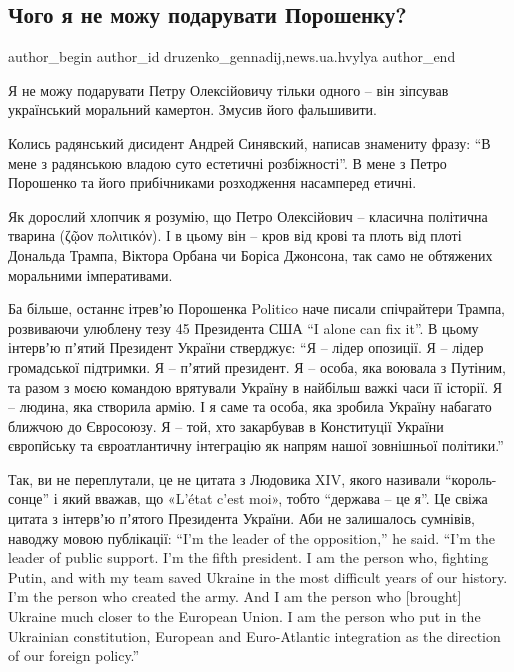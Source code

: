  
 
 
 
 
\subsection{Чого я не можу подарувати Порошенку?}
\label{sec:16_01_2022.stz.news.ua.hvylya.2.poroshenko_kamerton}

\ifcmt
 author_begin
   author_id druzenko_gennadij,news.ua.hvylya
 author_end
\fi

\begin{zznagolos}
Я не можу подарувати Петру Олексійовичу тільки одного – він зіпсував
український моральний камертон. Змусив його фальшивити.
\end{zznagolos}


Колись радянський дисидент Андрей Синявский, написав знамениту фразу: \enquote{В мене з
радянською владою суто естетичні розбіжності}. В мене з Петро Порошенко та його
прибічниками розходження насамперед етичні.

Як дорослий хлопчик я розумію, що Петро Олексійович – класична політична
тварина (ζῷον πoλιτικόν). І в цьому він – кров від крові та плоть від плоті
Дональда Трампа, Віктора Орбана чи Боріса Джонсона, так само не обтяжених
моральними імперативами.

Ба більше, останнє ітревʼю Порошенка Politico наче писали спічрайтери Трампа,
розвиваючи улюблену тезу 45 Президента США \enquote{I alone can fix it}. В цьому
інтервʼю пʼятий Президент України стверджує: \enquote{Я – лідер опозиції. Я – лідер
громадської підтримки. Я – пʼятий президент. Я – особа, яка воювала з Путіним,
та разом з моєю командою врятували Україну в найбільш важкі часи її історії. Я
– людина, яка створила армію. І я саме та особа, яка зробила Україну набагато
ближчою до Євросоюзу. Я – той, хто закарбував в Конституції України європйську
та євроатлантичну інтеграцію як напрям нашої зовнішньої політики.}

Так, ви не переплутали, це не цитата з Людовика XIV, якого називали
\enquote{король-сонце} і який вважав, що «L’état c’est moi», тобто \enquote{держава – це я}. Це
свіжа цитата з інтервʼю пʼятого Президента України. Аби не залишалось сумнівів,
наводжу мовою публікації: \enquote{I’m the leader of the opposition,} he said. \enquote{I’m the
leader of public support. I’m the fifth president. I am the person who,
fighting Putin, and with my team saved Ukraine in the most difficult years of
our history. I’m the person who created the army. And I am the person who
[brought] Ukraine much closer to the European Union. I am the person who put in
the Ukrainian constitution, European and Euro-Atlantic integration as the
direction of our foreign policy.}

